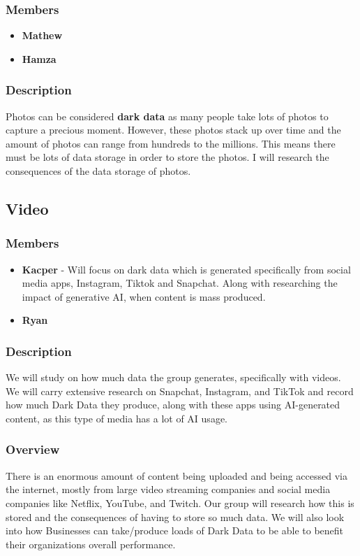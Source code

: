 \documentclass{article}
\begin{document}
        \subsubsection{Members}
        \begin{itemize}
            \item \textbf{Mathew}
            \item \textbf{Hamza}
        \end{itemize}
        \subsubsection{Description}
        Photos can be considered \textbf{dark data} as many people take lots of photos to capture a precious moment. However, these photos stack up over time and the amount of photos can range from hundreds to the millions. This means there must be lots of data storage in order to store the photos.
        I will research the consequences of the data storage of photos.

    \subsection{Video}
        \subsubsection{Members}
        \begin{itemize}
            \item \textbf{Kacper} - Will focus on dark data which is generated specifically from social media apps, Instagram, Tiktok and Snapchat. Along with researching the impact of generative AI, when
            content is mass produced.
            \item \textbf{Ryan}
        \end{itemize}
        \subsubsection{Description}
        We will study on how much data the group generates, specifically with videos. We will carry extensive research on Snapchat, Instagram, and TikTok and record how much Dark Data they produce, along with these apps using AI-generated content, as this type of media has a lot of AI usage.

        \subsubsection{Overview}
        There is an enormous amount of content being uploaded and being accessed via the internet, mostly from large video 
        streaming companies and social media companies like Netflix, YouTube, and Twitch. Our group will research
        how this is stored and the consequences of having to store so much data. We will also look into how Businesses can
        take/produce loads of Dark Data to be able to benefit their organizations overall performance.
\end{document}
